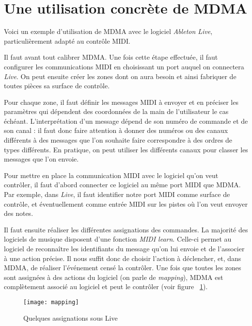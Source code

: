 \section{Une utilisation concrète de MDMA}
\par Voici un exemple d'utilisation de MDMA avec le logiciel \emph{Ableton Live}, particulièrement adapté au contrôle MIDI.
\par Il faut avant tout calibrer MDMA. Une fois cette étape effectuée, il faut configurer les communications MIDI en choisissant un port auquel on connectera \emph{Live}. On peut ensuite créer les zones dont on aura besoin et ainsi fabriquer de toutes pièces sa surface de contrôle.
\par Pour chaque zone, il faut définir les messages MIDI à envoyer et en préciser les paramètres qui dépendent des coordonnées de la main de l'utilisateur le cas échéant. L'interprétation d'un message dépend de son numéro de commande et de son canal : il faut donc faire attention à donner des numéros ou des canaux différents à des messages que l'on souhaite faire correspondre à des ordres de types différents. En pratique, on peut utiliser les différents canaux pour classer les messages que l'on envoie.
\par Pour mettre en place la communication MIDI avec le logiciel qu'on veut contrôler, il faut d'abord connecter ce logiciel au même port MIDI que MDMA. Par exemple, dans \emph{Live}, il faut identifier notre port MIDI comme surface de contrôle, et éventuellement comme entrée MIDI sur les pistes où l'on veut envoyer des notes.
\par Il faut ensuite réaliser les différentes assignations des commandes. La majorité des logiciels de musique disposent d'une fonction \emph{MIDI learn}. Celle-ci permet au logiciel de reconnaître les identifiants du message qu'on lui envoie et de l'associer à une action précise. Il nous suffit donc de choisir l'action à déclencher, et, dans MDMA, de réaliser l'événement censé la contrôler. Une fois que toutes les zones sont assignées à des actions du logiciel (on parle de \emph{mapping}), MDMA est complètement associé au logiciel et peut le contrôler (voir figure ~\ref{live}).
\begin{figure}[h]
  \centering
    \texttt{[image: mapping]}
  \caption{Quelques assignations sous Live}
  \label{live}
\end{figure}
